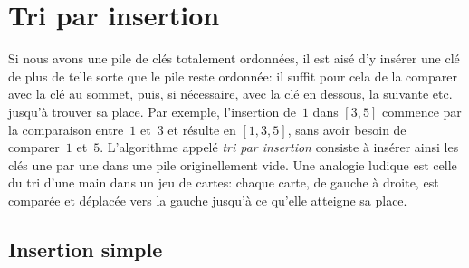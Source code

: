 \chapter{Tri par insertion}
\label{chap:insertion}

Si nous avons une pile de clés totalement ordonnées, il est aisé d'y
insérer une clé de plus de telle sorte que le pile reste ordonnée: il
suffit pour cela de la comparer avec la clé au sommet, puis, si
nécessaire, avec la clé en dessous, la suivante etc. jusqu'à trouver
sa place. Par exemple, l'insertion de~\(1\) dans \([3,5]\) commence
par la comparaison entre~\(1\) et~\(3\) et résulte en \([1,3,5]\),
sans avoir besoin de comparer~\(1\) et~\(5\). L'algorithme appelé
\emph{tri par insertion} \citep{Knuth_1998}
consiste à insérer ainsi les clés une par une dans une pile
originellement vide. Une analogie ludique est celle du tri d'une main
dans un jeu de cartes: chaque carte, de gauche à droite, est comparée
et déplacée vers la gauche jusqu'à ce qu'elle atteigne sa place.

\section{Insertion simple}
\label{sec:straight_ins}


